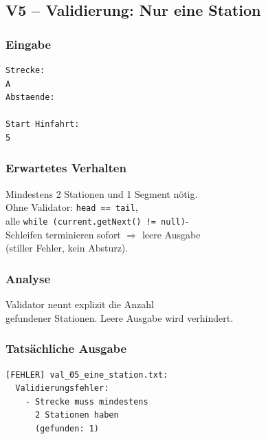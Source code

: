 \documentclass[12pt,a4paper]{article}
\begin{document}
\subsection{V5 – Validierung: Nur eine Station}
\label{test:v5}

\noindent
\begin{minipage}[t]{0.48\textwidth}
\scriptsize
\setlength{\tabcolsep}{2pt}

\subsubsection*{Eingabe}
\begin{lstlisting}
Strecke:
A
Abstaende:

Start Hinfahrt:
5
\end{lstlisting}

\subsubsection*{Erwartetes Verhalten}
Mindestens 2 Stationen und 1 Segment nötig.\\
Ohne Validator: \texttt{head == tail},\\
alle \texttt{while (current.getNext() != null)}-\\
Schleifen terminieren sofort $\Rightarrow$ leere Ausgabe\\
(stiller Fehler, kein Absturz).

\subsubsection*{Analyse}
Validator nennt explizit die Anzahl\\
gefundener Stationen.
Leere Ausgabe wird verhindert.
\end{minipage}
\hfill
\begin{minipage}[t]{0.48\textwidth}
\scriptsize
\subsubsection*{Tatsächliche Ausgabe}
\begin{lstlisting}
[FEHLER] val_05_eine_station.txt:
  Validierungsfehler:
    - Strecke muss mindestens
      2 Stationen haben
      (gefunden: 1)
\end{lstlisting}
\end{minipage}

\end{document}
